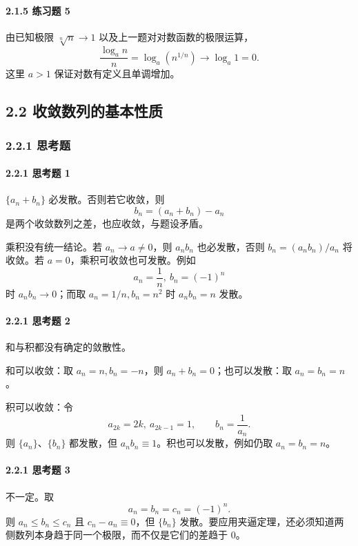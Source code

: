 \paragraph{2.1.5 练习题 5}
\begin{xsolution}
由已知极限 $\sqrt[n]n\to1$ 以及上一题对对数函数的极限运算，
\[
  \frac{\log_a n}{n}
  =\log_a\left(n^{1/n}\right)
  \longrightarrow\log_a1=0.
\]
这里 $a>1$ 保证对数有定义且单调增加。
\end{xsolution}

\subsection*{2.2 收敛数列的基本性质}

\subsubsection*{2.2.1 思考题}

\paragraph{2.2.1 思考题 1}
\begin{xsolution}
$\{a_n+b_n\}$ 必发散。否则若它收敛，则
\[
  b_n=(a_n+b_n)-a_n
\]
是两个收敛数列之差，也应收敛，与题设矛盾。

乘积没有统一结论。若 $a_n\to a\ne0$，则 $a_nb_n$ 也必发散，否则 $b_n=(a_nb_n)/a_n$ 将收敛。若 $a=0$，乘积可收敛也可发散。例如
\[
  a_n=\frac1n,\ b_n=(-1)^n
\]
时 $a_nb_n\to0$；而取 $a_n=1/n,b_n=n^2$ 时 $a_nb_n=n$ 发散。
\end{xsolution}

\paragraph{2.2.1 思考题 2}
\begin{xsolution}
和与积都没有确定的敛散性。

和可以收敛：取 $a_n=n,b_n=-n$，则 $a_n+b_n=0$；也可以发散：取 $a_n=b_n=n$。

积可以收敛：令
\[
  a_{2k}=2k,\ a_{2k-1}=1,
  \qquad
  b_n=\frac1{a_n}.
\]
则 $\{a_n\}$、$\{b_n\}$ 都发散，但 $a_nb_n\equiv1$。积也可以发散，例如仍取 $a_n=b_n=n$。
\end{xsolution}

\paragraph{2.2.1 思考题 3}
\begin{xsolution}
不一定。取
\[
  a_n=b_n=c_n=(-1)^n.
\]
则 $a_n\le b_n\le c_n$ 且 $c_n-a_n\equiv0$，但 $\{b_n\}$ 发散。要应用夹逼定理，还必须知道两侧数列本身趋于同一个极限，而不仅是它们的差趋于 $0$。
\end{xsolution}

